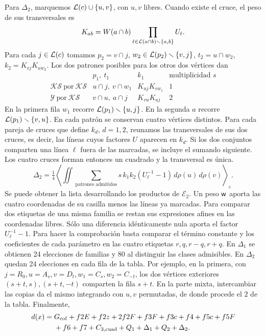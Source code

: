 Para \(\Delta_2\), marquemos \(\mathcal L(c)\cup\{u,v\}\), con \(u,v\) libres. Cuando existe el cruce,
el peso de sus transversales es
\[
 K_{ab}=W(a\cap b)\prod_{\ell\in \mathcal L(a\cap b)\smallsetminus\{a,b\}}U_\ell .
\]
Para cada \(j\in \mathcal L(c)\) tomamos \(p_2=v\cap j\),
\(w_2\in \mathcal L(p_2)\smallsetminus\{v,j\}\), \(t_2=u\cap w_2\), \(k_2=K_{vj}K_{uw_2}\).
Los dos patrones posibles para los otros dos vértices dan
\[
\begin{array}{c|c|c|c}
 &p_1,\ t_1 &k_1&\text{multiplicidad }s\\ \hline
 \mathcal K\mathcal S\ \text{por}\ \mathcal K\mathcal S&
 u\cap j,\ v\cap w_1 & K_{uj}K_{vw_1}&1\\
 \mathcal Y\ \text{por}\ \mathcal K\mathcal S&
 v\cap u,\ a\cap j & K_{vu}K_{aj}&2
\end{array}
\]
En la primera fila \(w_1\) recorre \(\mathcal L(p_1)\smallsetminus\{u,j\}\). En la segunda \(a\)
recorre \(\mathcal L(p_1)\smallsetminus\{v,u\}\). En cada patrón se conservan cuatro vértices distintos.
Para cada pareja de cruces que define \(k_d\), \(d=1,2\), reunamos las transversales de
sus dos cruces, es decir, las líneas cuyos factores \(U\) aparecen en \(k_d\).
Si los dos conjuntos comparten una línea \(\ell\) fuera de las marcadas, se incluye el
sumando siguiente. Los cuatro cruces forman entonces un cuadrado y la transversal es única.
\[
 \Delta_2=\tfrac14\left\langle\iint\sum_{\text{patrones admitidos}}
          s\,k_1k_2(U_\ell^{-1}-1)\,d\rho(u)\,d\rho(v)\right\rangle_c .
\]
Se puede obtener la lista desarrollando los productos de \(\mathcal E_2\).
Un peso \(\mathsf w\) aporta las cuatro coordenadas de su casilla menos las líneas ya marcadas.
Para comparar dos etiquetas de una misma familia se restan sus expresiones afines en
las coordenadas libres. Sólo una diferencia idénticamente nula aporta el factor
\(U_\ell^{-1}-1\). Para hacer la comprobación basta comparar el término constante y
los coeficientes de cada parámetro en las cuatro etiquetas \(r,q,r-q,r+q\). En
\(\Delta_1\) se obtienen 24 elecciones de familias y 80 al distinguir las clases admisibles.
En \(\Delta_2\) quedan 24 elecciones en cada fila de la tabla. Por ejemplo, en la primera,
con \(j=R_0,u=A_s,v=D_t,w_1=C_s,w_2=C_{-t}\), los dos vértices exteriores
\((s+t,s),(s+t,-t)\) comparten la fila \(s+t\). En la parte mixta, intercambiar las copias da el mismo
integrando con \(u,v\) permutadas, de donde procede el \(2\) de la tabla.
Finalmente,
\begin{align}
 d(x)={}&G_{\rm cof}+f2E+f2z+2f2F+f3F+f3c+f4+f5c+f5F\notag\\
        &+f6+f7+C_{3,\rm cuad}+Q_1+\Delta_1+Q_2+\Delta_2 .\label{eq:d-suma}
\end{align}
